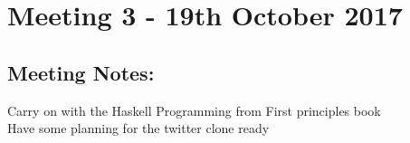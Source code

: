 \section{Meeting 3 - 19th October 2017}

\subsection{Meeting Notes:}

Carry on with the Haskell Programming from First principles book\\
Have some planning for the twitter clone ready
